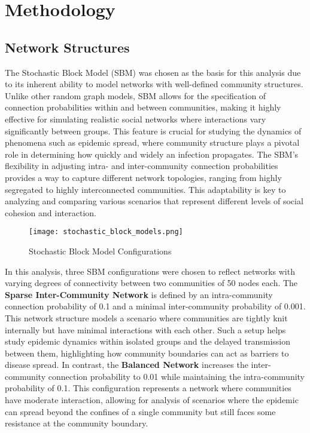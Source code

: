 \documentclass[12pt,a4paper]{article}
\begin{document}
\section{Methodology}


\subsection{Network Structures}




The Stochastic Block Model (SBM) was chosen as the basis for this analysis due to its inherent ability to model networks with well-defined community structures. Unlike other random graph models, SBM allows for the specification of connection probabilities within and between communities, making it highly effective for simulating realistic social networks where interactions vary significantly between groups. This feature is crucial for studying the dynamics of phenomena such as epidemic spread, where community structure plays a pivotal role in determining how quickly and widely an infection propagates. The SBM’s flexibility in adjusting intra- and inter-community connection probabilities provides a way to capture different network topologies, ranging from highly segregated to highly interconnected communities. This adaptability is key to analyzing and comparing various scenarios that represent different levels of social cohesion and interaction.

\begin{figure}[H]
    \centering
    \texttt{[image: stochastic\_block\_models.png]}
    \caption{Stochastic Block Model Configurations}
    \label{fig:enter-label}
\end{figure}

In this analysis, three SBM configurations were chosen to reflect networks with varying degrees of connectivity between two communities of 50 nodes each. The \textbf{Sparse Inter-Community Network} is defined by an intra-community connection probability of 0.1 and a minimal inter-community probability of 0.001. This network structure models a scenario where communities are tightly knit internally but have minimal interactions with each other. Such a setup helps study epidemic dynamics within isolated groups and the delayed transmission between them, highlighting how community boundaries can act as barriers to disease spread. In contrast, the \textbf{Balanced Network} increases the inter-community connection probability to 0.01 while maintaining the intra-community probability of 0.1. This configuration represents a network where communities have moderate interaction, allowing for analysis of scenarios where the epidemic can spread beyond the confines of a single community but still faces some resistance at the community boundary.
\end{document}
